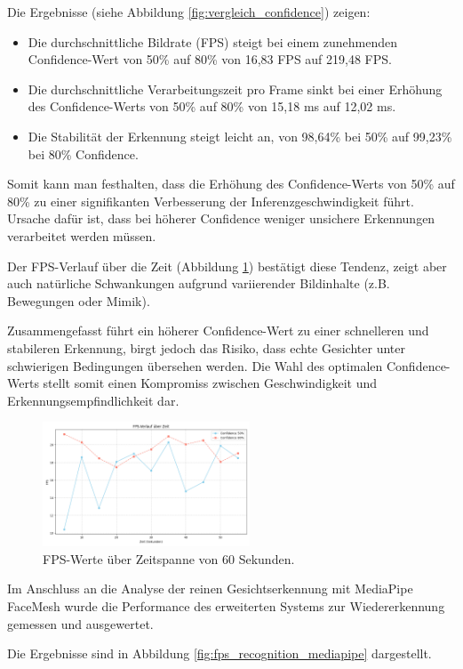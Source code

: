 Die Ergebnisse (siehe Abbildung \ref{fig:vergleich_confidence}) zeigen:
\begin{itemize}
    \item Die durchschnittliche Bildrate (FPS) steigt bei einem zunehmenden Confidence-Wert von 50\% auf 80\% von 16,83 FPS auf 219,48 FPS.
    \item Die durchschnittliche Verarbeitungszeit pro Frame sinkt bei einer Erhöhung des Confidence-Werts von 50\% auf 80\% von 15,18 ms auf 12,02 ms.
    \item Die Stabilität der Erkennung steigt leicht an, von 98,64\% bei 50\% auf 99,23\% bei 80\% Confidence.
\end{itemize}
Somit kann man festhalten, dass die Erhöhung des Confidence-Werts von 50\% auf 80\% zu einer signifikanten Verbesserung der Inferenzgeschwindigkeit führt. Ursache dafür ist, dass bei höherer Confidence weniger unsichere Erkennungen verarbeitet werden müssen.

Der FPS-Verlauf über die Zeit (Abbildung \ref{fig:fps_ueber_zeit}) bestätigt diese Tendenz, zeigt aber auch natürliche Schwankungen aufgrund variierender Bildinhalte (z.B. Bewegungen oder Mimik).

Zusammengefasst führt ein höherer Confidence-Wert zu einer schnelleren und stabileren Erkennung, birgt jedoch das Risiko, dass echte Gesichter unter schwierigen Bedingungen übersehen werden. Die Wahl des optimalen Confidence-Werts stellt somit einen Kompromiss zwischen Geschwindigkeit und Erkennungsempfindlichkeit dar.

\begin{figure}[ht]
    \centering
    \includegraphics[width=0.55\textwidth]{data/FPS_ueber_Zeit.png}
    \caption{FPS-Werte über Zeitspanne von 60 Sekunden.}
    \label{fig:fps_ueber_zeit}
\end{figure}

Im Anschluss an die Analyse der reinen Gesichtserkennung mit MediaPipe FaceMesh wurde die Performance des erweiterten Systems zur Wiedererkennung gemessen und ausgewertet.

Die Ergebnisse sind in Abbildung \ref{fig:fps_recognition_mediapipe} dargestellt.

